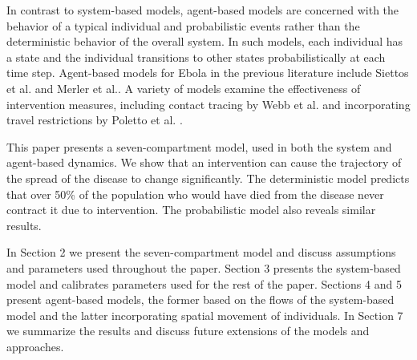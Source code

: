 In contrast to system-based models, agent-based models are concerned with the behavior of a typical individual and probabilistic events rather than the deterministic behavior of the overall system. In such models, each individual has a state and the individual transitions to other states probabilistically at each time step. Agent-based models for Ebola in the previous literature include Siettos et al. \cite{Siettos2015} and Merler et al.\cite{Merler2015}. A variety of models examine the effectiveness of intervention measures, including contact tracing by Webb et al. \cite{Webb2015} and incorporating travel restrictions by Poletto et al. \cite{Poletto2014}.

This paper presents a seven-compartment model, used in both the system and agent-based dynamics. We show that an intervention can cause the trajectory of the spread of the disease to change significantly. The deterministic model predicts that over 50\% of the population who would have died from the disease never contract it due to intervention. The probabilistic model also reveals similar results.

In Section 2 we present the seven-compartment model and discuss assumptions and parameters used throughout the paper. Section 3 presents the system-based model and calibrates parameters used for the rest of the paper. Sections 4 and 5 present agent-based models, the former based on the flows of the system-based model and the latter incorporating spatial movement of individuals. In Section 7 we summarize the results and discuss future extensions of the models and approaches. 
